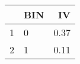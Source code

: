 \begin{table}[ht]
\centering
\begin{tabular}{rlr}
  \hline
 & BIN & IV \\ 
  \hline
1 & 0 & 0.37 \\ 
  2 & 1 & 0.11 \\ 
   \hline
\end{tabular}
\end{table}
